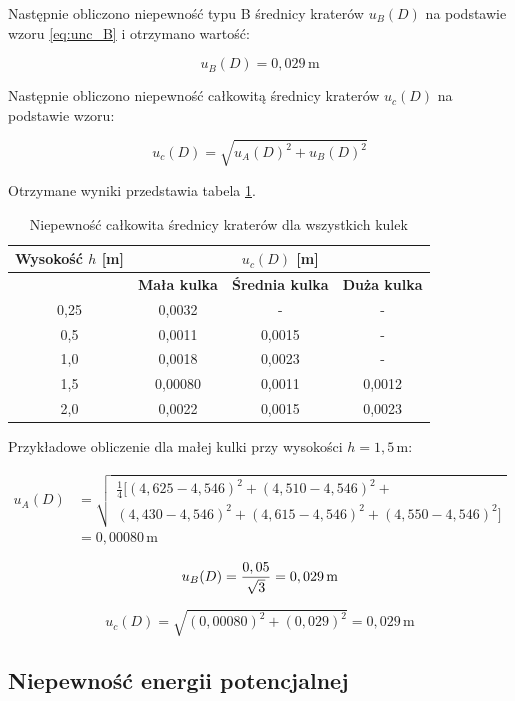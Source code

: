\documentclass[a4paper,12pt]{article}
\begin{document}
Następnie obliczono niepewność typu B średnicy kraterów $u_B(D)$ na podstawie wzoru \eqref{eq:unc_B} i otrzymano wartość: 

$$
u_B(D) = 0,029 \, \text{m}
$$

Następnie obliczono niepewność całkowitą średnicy kraterów $u_c(D)$ na podstawie wzoru:

\[
u_c(D) = \sqrt{u_A(D)^2 + u_B(D)^2}
\]

Otrzymane wyniki przedstawia tabela \ref{tab:niepewnosc_calkowita_srednicy}.

\begin{table}[H]
\centering
\begin{tabular}{|c|c|c|c|}
\hline
\textbf{Wysokość $h$ [m]} & \multicolumn{3}{c|}{\textbf{$u_c(D)$ [m]}} \\
\hline
& \textbf{Mała kulka} & \textbf{Średnia kulka} & \textbf{Duża kulka} \\
\hline
0,25 & 0,0032 & - & - \\
\hline
0,5  & 0,0011 & 0,0015 & - \\
\hline
1,0  & 0,0018 & 0,0023 & - \\
\hline
1,5  & 0,00080 & 0,0011 & 0,0012 \\
\hline
2,0  & 0,0022 & 0,0015 & 0,0023 \\
\hline
\end{tabular}
\caption{Niepewność całkowita średnicy kraterów dla wszystkich kulek}
\label{tab:niepewnosc_calkowita_srednicy}
\end{table}

Przykładowe obliczenie dla małej kulki przy wysokości $h=1,5\,\text{m}$:

\begin{align*}
u_A(D) &= \sqrt{\begin{gathered}
    \frac{1}{4} [(4,625 - 4,546)^2 + (4,510 - 4,546)^2 + \\
    (4,430 - 4,546)^2 + (4,615 - 4,546)^2 + (4,550 - 4,546)^2]
\end{gathered}} \\
&= 0,00080\,\text{m}
\end{align*}

$$
u_B(D) = \frac{0,05}{\sqrt{3}} = 0,029\,\text{m} \\[1em]
$$

$$
u_c(D) = \sqrt{(0,00080)^2 + (0,029)^2} = 0,029\,\text{m}
$$




\subsection{Niepewność energii potencjalnej}
\end{document}
